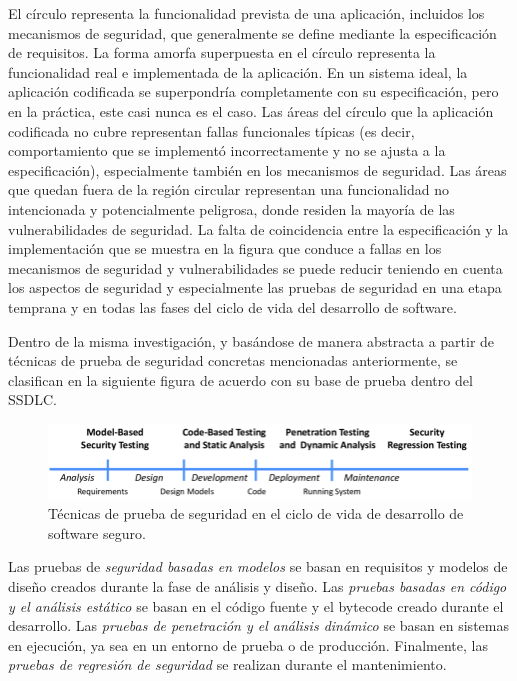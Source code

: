 El círculo representa la funcionalidad prevista de una aplicación, incluidos los mecanismos de seguridad, que generalmente se define mediante la especificación de requisitos. La forma amorfa superpuesta en el círculo representa la funcionalidad real e implementada de la aplicación. En un sistema ideal, la aplicación codificada se superpondría completamente con su especificación, pero en la práctica, este casi nunca es el caso. Las áreas del círculo que la aplicación codificada no cubre representan fallas funcionales típicas (es decir, comportamiento que se implementó incorrectamente y no se ajusta a la especificación), especialmente también en los mecanismos de seguridad. Las áreas que quedan fuera de la región circular representan una funcionalidad no intencionada y potencialmente peligrosa, donde residen la mayoría de las vulnerabilidades de seguridad. La falta de coincidencia entre la especificación y la implementación que se muestra en la figura que conduce a fallas en los mecanismos de seguridad y vulnerabilidades se puede reducir teniendo en cuenta los aspectos de seguridad y especialmente las pruebas de seguridad en una etapa temprana y en todas las fases del ciclo de vida del desarrollo de software.

Dentro de la misma investigación, y basándose de manera abstracta a partir de técnicas de prueba de seguridad concretas mencionadas anteriormente, se clasifican en la siguiente figura de acuerdo con su base de prueba dentro del SSDLC.

\begin{figure}[h]
    \centering
    \includegraphics[scale=0.5]{images/TechniquesInTheSSDLC.png}
    \caption{Técnicas de prueba de seguridad en el ciclo de vida de desarrollo de software seguro.}
    \label{fig:ssdlc techniques}
\end{figure}

Las pruebas de \textit{seguridad basadas en modelos} se basan en requisitos y modelos de diseño creados durante la fase de análisis y diseño. Las \textit{pruebas basadas en código y el análisis estático} se basan en el código fuente y el bytecode creado durante el desarrollo. Las \textit{pruebas de penetración y el análisis dinámico} se basan en sistemas en ejecución, ya sea en un entorno de prueba o de producción. Finalmente, las \textit{pruebas de regresión de seguridad} se realizan durante el mantenimiento.



